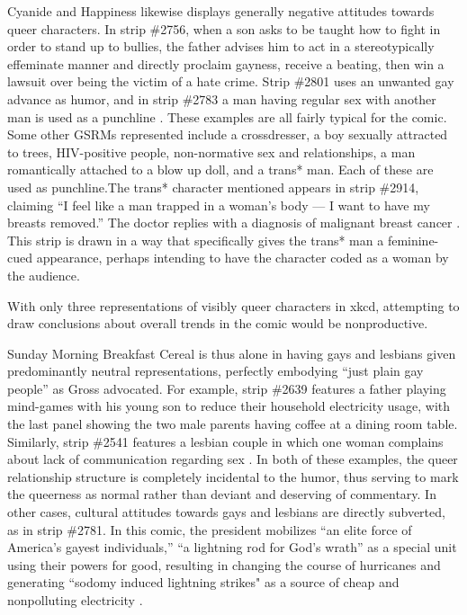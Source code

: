 \documentclass[man,12pt]{apa6}
\begin{document}
Cyanide and Happiness likewise displays generally negative attitudes towards queer characters. In strip \#2756, when a son asks to be taught how to fight in order to stand up to bullies, the father advises him to act in a stereotypically effeminate manner and directly proclaim gayness, receive a beating, then win a lawsuit over being the victim of a hate crime. Strip \#2801 uses an unwanted gay advance as humor, and in strip \#2783 a man having regular sex with another man is used as a punchline \cite{ch}. These examples are all fairly typical for the comic. Some other GSRMs represented include a crossdresser, a boy sexually attracted to trees, HIV-positive people, non-normative sex and relationships, a man romantically attached to a blow up doll, and a trans* man. Each of these are used as punchline.The trans* character mentioned appears in strip \#2914, claiming ``I feel like a man trapped in a woman's body --- I want to have my breasts removed.'' The doctor replies with a diagnosis of malignant breast cancer \cite{ch}. This strip is drawn in a way that specifically gives the trans* man a feminine-cued appearance, perhaps intending to have the character coded as a woman by the audience. 

With only three representations of visibly queer characters in xkcd, attempting to draw conclusions about overall trends in the comic would be nonproductive.

Sunday Morning Breakfast Cereal is thus alone in having gays and lesbians given predominantly neutral representations, perfectly embodying ``just plain gay people'' as Gross \citeyear{gross} advocated. For example, strip \#2639 features a father playing mind-games with his young son to reduce their household electricity usage, with the last panel showing the two male parents having coffee at a dining room table. Similarly, strip \#2541 features a lesbian couple in which one woman complains about lack of communication regarding sex \cite{smbc}. In both of these examples, the queer relationship structure is completely incidental to the humor, thus serving to mark the queerness as normal rather than deviant and deserving of commentary. In other cases, cultural attitudes towards gays and lesbians are directly subverted, as in strip \#2781. In this comic, the president mobilizes ``an elite force of America's gayest individuals,'' ``a lightning rod for God's wrath'' as a special unit using their powers for good, resulting in changing the course of hurricanes and generating ``sodomy induced lightning strikes" as a source of cheap and nonpolluting electricity \cite{smbc}.
\end{document}
